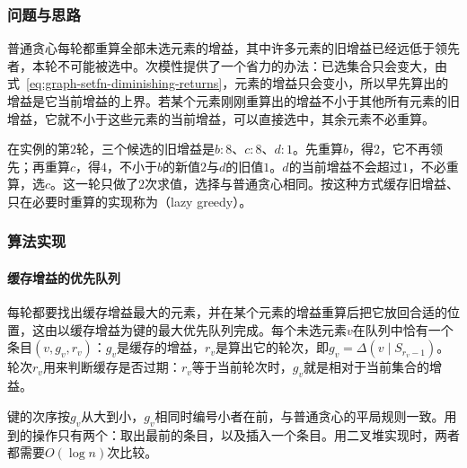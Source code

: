 \subsubsection{问题与思路}

普通贪心每轮都重算全部未选元素的增益，其中许多元素的旧增益已经远低于领先者，本轮不可能被选中。次模性提供了一个省力的办法：已选集合只会变大，由式~\eqref{eq:graph-setfn-diminishing-returns}，元素的增益只会变小，所以早先算出的增益是它当前增益的上界。若某个元素刚刚重算出的增益不小于其他所有元素的旧增益，它就不小于这些元素的当前增益，可以直接选中，其余元素不必重算。

在实例的第$2$轮，三个候选的旧增益是$b{:}8$、$c{:}8$、$d{:}1$。先重算$b$，得$2$，它不再领先；再重算$c$，得$4$，不小于$b$的新值$2$与$d$的旧值$1$。$d$的当前增益不会超过$1$，不必重算，选$c$。这一轮只做了$2$次求值，选择与普通贪心相同。按这种方式缓存旧增益、只在必要时重算的实现称为（lazy greedy）。

\subsubsection{算法实现}

\paragraph{缓存增益的优先队列}
每轮都要找出缓存增益最大的元素，并在某个元素的增益重算后把它放回合适的位置，这由以缓存增益为键的最大优先队列完成。每个未选元素$v$在队列中恰有一个条目$(v,g_v,r_v)$：$g_v$是缓存的增益，$r_v$是算出它的轮次，即$g_v=\Delta(v\mid S_{r_v-1})$。轮次$r_v$用来判断缓存是否过期：$r_v$等于当前轮次时，$g_v$就是相对于当前集合的增益。

键的次序按$g_v$从大到小，$g_v$相同时编号小者在前，与普通贪心的平局规则一致。用到的操作只有两个：取出最前的条目，以及插入一个条目。用二叉堆实现时，两者都需要$O(\log n)$次比较。

